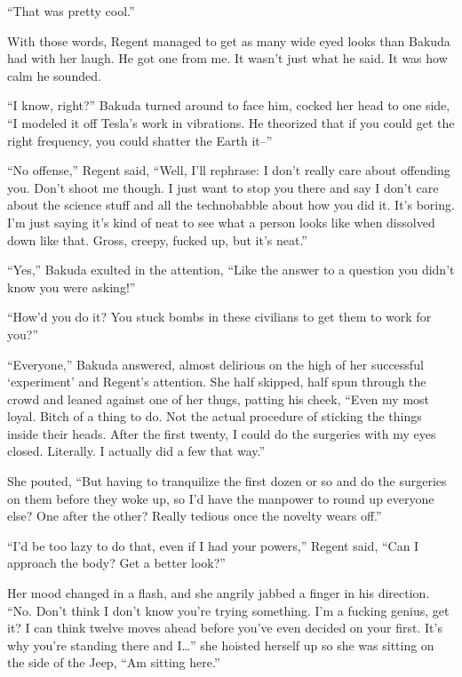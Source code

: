 ``That was pretty cool.''



With those words, Regent managed to get as many wide eyed looks than Bakuda had with her laugh.  He got one from me.  It wasn't just what he said.  It was how calm he sounded.



``I know, right?'' Bakuda turned around to face him, cocked her head to one side, ``I modeled it off Tesla's work in vibrations.  He theorized that if you could get the right frequency, you could shatter the Earth it--''



``No offense,'' Regent said, ``Well, I'll rephrase: I don't really care about offending you.  Don't shoot me though.  I just want to stop you there and say I don't care about the science stuff and all the technobabble about how you did it.  It's boring.  I'm just saying it's kind of neat to see what a person looks like when dissolved down like that.  Gross, creepy, fucked up, but it's neat.''



``Yes,'' Bakuda exulted in the attention, ``Like the answer to a question you didn't know you were asking!''



``How'd you do it?  You stuck bombs in these civilians to get them to work for you?''



``Everyone,'' Bakuda answered, almost delirious on the high of her successful `experiment' and Regent's attention.  She half skipped, half spun through the crowd and leaned against one of her thugs, patting his cheek, ``Even my most loyal.  Bitch of a thing to do.  Not the actual procedure of sticking the things inside their heads.  After the first twenty, I could do the surgeries with my eyes closed.  Literally.  I actually did a few that way.''



She pouted, ``But having to tranquilize the first dozen or so and do the surgeries on them before they woke up, so I'd have the manpower to round up everyone else?  One after the other?  Really tedious once the novelty wears off.''



``I'd be too lazy to do that, even if I had your powers,'' Regent said, ``Can I approach the body?  Get a better look?''



Her mood changed in a flash, and she angrily jabbed a finger in his direction. ``No.  Don't think I don't know you're trying something.  I'm a fucking genius, get it?  I can think twelve moves ahead before you've even decided on your first.  It's why you're standing there and I\ldots'' she hoisted herself up so she was sitting on the side of the Jeep, ``Am sitting here.''



